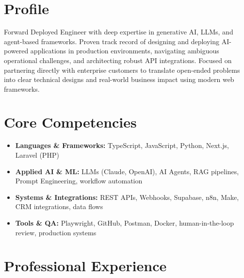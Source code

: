 \documentclass[11pt,a4paper,sans]{moderncv}
\begin{document}
\makecvtitle

\section{Profile}
Forward Deployed Engineer with deep expertise in generative AI, LLMs, and agent-based frameworks. Proven track record of designing and deploying AI-powered applications in production environments, navigating ambiguous operational challenges, and architecting robust API integrations. Focused on partnering directly with enterprise customers to translate open-ended problems into clear technical designs and real-world business impact using modern web frameworks.

\section{Core Competencies}
\begin{itemize}
\item \textbf{Languages \& Frameworks:} TypeScript, JavaScript, Python, Next.js, Laravel (PHP)
\item \textbf{Applied AI \& ML:} LLMs (Claude, OpenAI), AI Agents, RAG pipelines, Prompt Engineering, workflow automation
\item \textbf{Systems \& Integrations:} REST APIs, Webhooks, Supabase, n8n, Make, CRM integrations, data flows
\item \textbf{Tools \& QA:} Playwright, GitHub, Postman, Docker, human-in-the-loop review, production systems
\end{itemize}

\section{Professional Experience}

\end{document}
